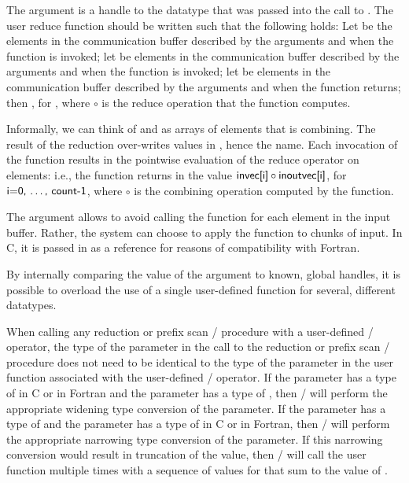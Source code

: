 The  argument
is a handle to the datatype that was passed into the call
to .
The user reduce function should be written such that the following
holds:
Let  be the  elements in the
communication buffer described by the arguments 
and  when the function is invoked;
let  be  elements in the
communication buffer described by the arguments 
and  when the function is invoked;
let  be   elements in the
communication buffer described by the arguments 
and  when the function returns;
then , for ,
where $\circ$ is the reduce operation that the function computes.

Informally, we can think of
 and  as arrays of  elements that
is combining.  The result of the reduction over-writes values in
, hence the name.  Each invocation of the function results in
the pointwise evaluation of the reduce operator on 
elements:
i.e., the function returns in  the value
$\textsf{invec[i]} \circ \textsf{inoutvec[i]}$, for $\textsf{i=0, \ldots , count-1}$,
where $\circ$ is the combining operation computed by the function.

\begin{rationale}
The
argument allows
 to avoid calling the function for each element
in the input buffer.  Rather, the system can choose to apply
the function to chunks of input.  In C, it is passed in as
a reference for reasons of compatibility with Fortran.

By internally comparing the value of the  argument to
known, global handles,
it is possible to overload the use of a single user-defined function
for several, different datatypes.
\end{rationale}

When calling any reduction or prefix scan \MPI/ procedure with a
user-defined \MPI/ operator, the type of the  parameter in
the call to the reduction or prefix scan \MPI/ procedure does not need
to be identical to the type of the  parameter in the user
function associated with the user-defined \MPI/ operator.  If the
 parameter has a type of  in C or
 in Fortran and the  parameter has a type
of , then \MPI/ will perform the appropriate widening
type conversion of the  parameter.  If the 
parameter has a type of  and the 
parameter has a type of  in C or  in
Fortran, then \MPI/ will perform the appropriate narrowing type
conversion of the  parameter.  If this narrowing
conversion would result in truncation of the  value, then
\MPI/ will call the user function multiple times with a sequence of
values for  that sum to the value of .

